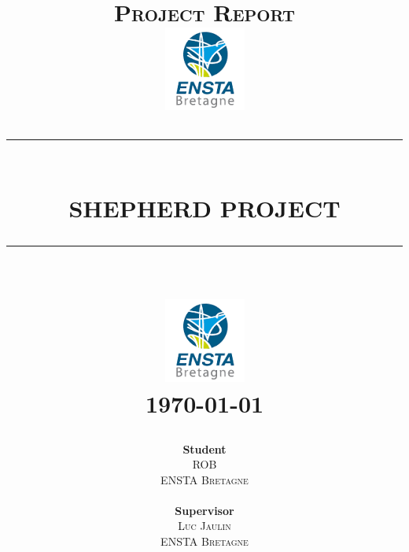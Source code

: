 \documentclass[a4paper]{report}
\begin{document}
\newcommand{\HRule}{\rule{\linewidth}{0.5mm}}

\begin{titlepage}
    \title{ %
    		\normalsize \textsc{Project Report}
            \\ [0.5cm]
            \includegraphics[scale=0.5]{image/logo_ensta.png} %
            \\ [1.0cm]
            \HRule{} 
            \\ [1.0cm]
            \LARGE \textbf{\uppercase{SHEPHERD Project}} 
            \\ [0.5cm]
            \HRule{} 
            \\ [0.5cm]
            \includegraphics[scale=0.5]{image/logo_ensta.png}
            \\ [0.5cm]
            \normalsize \today \vspace*{5\baselineskip}
    }


    \date{}

    \author{
            \textbf{Student}\\
            \textsc{ROB} \\
            \textsc{ENSTA Bretagne} \\
            \\
            \textbf{Supervisor}\\
            \textsc{Luc Jaulin}\\
            \textsc{ENSTA Bretagne} 
    }

    \maketitle
\end{titlepage}
\end{document}
